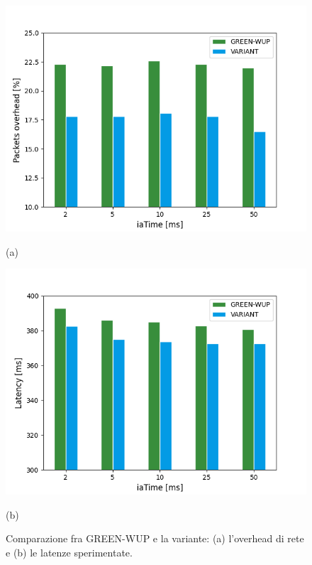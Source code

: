 \documentclass[binding=0.6cm,TFA]{sapthesis}
\begin{document}
\begin{figure}[H]
    \centering
    \begin{minipage}{.5\textwidth}
        \centering
        \includegraphics[width=1\linewidth]{overhead_plot.png}
        \caption*{(a)}
    \end{minipage}%
    \begin{minipage}{.5\textwidth}
        \centering
        \includegraphics[width=1\linewidth]{latency_plot.png}
        \caption*{(b)}
    \end{minipage}
    \caption{Comparazione fra GREEN-WUP e la variante: (a) l'overhead di rete e (b) le latenze sperimentate.}
    \label{performance-overhead}
\end{figure}
\end{document}
